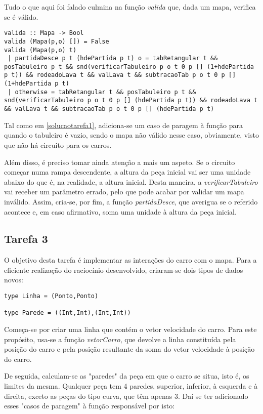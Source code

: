 \documentclass[a4paper]{report}
\begin{document}
Tudo o que aqui foi falado culmina na função \textit{valida} que, dada um mapa, verifica se é válido.

\begin{lstlisting}
valida :: Mapa -> Bool
valida (Mapa(p,o) []) = False
valida (Mapa(p,o) t) 
 | partidaDesce p t (hdePartida p t) o = tabRetangular t && posTabuleiro p t && snd(verificarTabuleiro p o t 0 p [] (1+hdePartida p t)) && rodeadoLava t && valLava t && subtracaoTab p o t 0 p [] (1+hdePartida p t)
 | otherwise = tabRetangular t && posTabuleiro p t && snd(verificarTabuleiro p o t 0 p [] (hdePartida p t)) && rodeadoLava t && valLava t && subtracaoTab p o t 0 p [] (hdePartida p t)
\end{lstlisting}

Tal como em \ref{solucaotarefa1}, adiciona-se um caso de paragem à função para quando o tabuleiro é vazio, sendo o mapa não válido nesse caso, obviamente, visto que não há circuito para os carros.

Além disso, é preciso tomar ainda atenção a mais um aspeto. Se o circuito começar numa rampa descendente, a altura da peça inicial vai ser uma unidade abaixo do que é, na realidade, a altura inicial. Desta maneira, a \textit{verificarTabuleiro} vai receber um parâmetro errado, pelo que pode acabar por validar um mapa inválido. Assim, cria-se, por fim, a função \textit{partidaDesce}, que averigua se o referido acontece e, em caso afirmativo, soma uma unidade à altura da peça inicial.

\subsection{Tarefa 3}

O objetivo desta tarefa é implementar as interações do carro com o mapa. Para a eficiente realização do raciocínio desenvolvido, criaram-se dois tipos de dados novos: 

\begin{verbatim}
type Linha = (Ponto,Ponto)

type Parede = ((Int,Int),(Int,Int))
\end{verbatim}

Começa-se por criar uma linha que contém o vetor velocidade do carro. Para este propósito, usa-se a função \textit{vetorCarro}, que devolve a linha constituída pela posição do carro e pela posição resultante da soma do vetor velocidade à posição do carro.

De seguida, calculam-se as "paredes" da peça em que o carro se situa, isto é, os limites da mesma. Qualquer peça tem 4 paredes, superior, inferior, à esquerda e à direita, exceto as peças do tipo curva, que têm apenas 3. Daí se ter adicionado esses "casos de paragem" à função responsável por isto:
\end{document}

